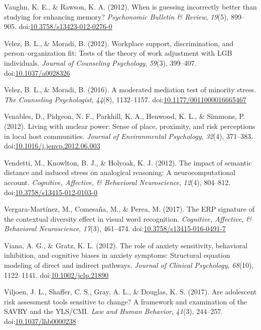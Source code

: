 \documentclass[english,man]{apa6}
\theoremstyle{definition}
\theoremstyle{definition}
\theoremstyle{definition}
\theoremstyle{remark}
\begin{document}
\hypertarget{ref-Vaughn2012}{}
Vaughn, K. E., \& Rawson, K. A. (2012). When is guessing incorrectly
better than studying for enhancing memory? \emph{Psychonomic Bulletin \&
Review}, \emph{19}(5), 899--905.
doi:\href{https://doi.org/10.3758/s13423-012-0276-0}{10.3758/s13423-012-0276-0}

\hypertarget{ref-Velez2012}{}
Velez, B. L., \& Moradi, B. (2012). Workplace support, discrimination,
and person--organization fit: Tests of the theory of work adjustment
with LGB individuals. \emph{Journal of Counseling Psychology},
\emph{59}(3), 399--407.
doi:\href{https://doi.org/10.1037/a0028326}{10.1037/a0028326}

\hypertarget{ref-Velez2016}{}
Velez, B. L., \& Moradi, B. (2016). A moderated mediation test of
minority stress. \emph{The Counseling Psychologist}, \emph{44}(8),
1132--1157.
doi:\href{https://doi.org/10.1177/0011000016665467}{10.1177/0011000016665467}

\hypertarget{ref-Venables2012}{}
Venables, D., Pidgeon, N. F., Parkhill, K. A., Henwood, K. L., \&
Simmons, P. (2012). Living with nuclear power: Sense of place,
proximity, and risk perceptions in local host communities. \emph{Journal
of Environmental Psychology}, \emph{32}(4), 371--383.
doi:\href{https://doi.org/10.1016/j.jenvp.2012.06.003}{10.1016/j.jenvp.2012.06.003}

\hypertarget{ref-Vendetti2012}{}
Vendetti, M., Knowlton, B. J., \& Holyoak, K. J. (2012). The impact of
semantic distance and induced stress on analogical reasoning: A
neurocomputational account. \emph{Cognitive, Affective, \& Behavioral
Neuroscience}, \emph{12}(4), 804--812.
doi:\href{https://doi.org/10.3758/s13415-012-0103-0}{10.3758/s13415-012-0103-0}

\hypertarget{ref-Vergara-Martinez2017}{}
Vergara-Martínez, M., Comesaña, M., \& Perea, M. (2017). The ERP
signature of the contextual diversity effect in visual word recognition.
\emph{Cognitive, Affective, \& Behavioral Neuroscience}, \emph{17}(3),
461--474.
doi:\href{https://doi.org/10.3758/s13415-016-0491-7}{10.3758/s13415-016-0491-7}

\hypertarget{ref-Viana2012}{}
Viana, A. G., \& Gratz, K. L. (2012). The role of anxiety sensitivity,
behavioral inhibition, and cognitive biases in anxiety symptoms:
Structural equation modeling of direct and indirect pathways.
\emph{Journal of Clinical Psychology}, \emph{68}(10), 1122--1141.
doi:\href{https://doi.org/10.1002/jclp.21890}{10.1002/jclp.21890}

\hypertarget{ref-Viljoen2017}{}
Viljoen, J. L., Shaffer, C. S., Gray, A. L., \& Douglas, K. S. (2017).
Are adolescent risk assessment tools sensitive to change? A framework
and examination of the SAVRY and the YLS/CMI. \emph{Law and Human
Behavior}, \emph{41}(3), 244--257.
doi:\href{https://doi.org/10.1037/lhb0000238}{10.1037/lhb0000238}
\end{document}
